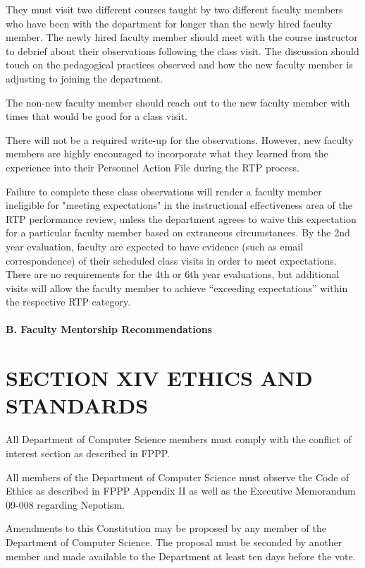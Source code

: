 \documentclass{scrartcl}
\begin{document}
They must visit two different courses taught by two different faculty members who have been with the department for longer than the newly hired faculty member. The newly hired faculty member should meet with the course instructor to debrief about their observations following the class visit. The discussion should touch on the pedagogical practices observed and how the new faculty member is adjusting to joining the department.

The non-new faculty member should reach out to the new faculty member with times that would be good for a class visit.

There will not be a required write-up for the observations. However, new faculty members are highly encouraged to incorporate what they learned from the experience into their Personnel Action File during the RTP process.

Failure to complete these class observations will render a faculty member ineligible for "meeting  expectations" in the instructional effectiveness area of the RTP performance review, unless the department agrees to waive this expectation for a particular faculty member based on extraneous circumstances. By the 2nd year evaluation, faculty are expected to have evidence (such as email correspondence) of their scheduled class visits in order to meet expectations. There are no requirements for the 4th or 6th year evaluations, but additional visits will allow the faculty member to achieve “exceeding expectations” within the respective RTP category.

\paragraph{B. Faculty Mentorship Recommendations}


\section*{SECTION XIV ETHICS AND STANDARDS}
{}


All Department of Computer Science members must comply with the conflict of interest section as described in FPPP.

All members of the Department of Computer Science must observe the Code of Ethics as described in FPPP Appendix II as well as the Executive Memorandum 09-008 regarding Nepotism.

Amendments to this Constitution may be proposed by any member of the Department of Computer Science. The proposal must be seconded by another member and made available to the Department at least ten days before the vote.
\end{document}
